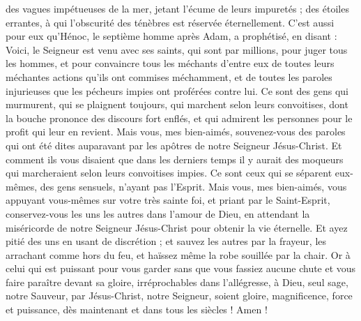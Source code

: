 \begin{multicols}{2}
des vagues impétueuses de la mer, jetant l'écume de leurs impuretés ; des étoiles errantes, à qui l'obscurité des ténèbres est réservée éternellement.
C'est aussi pour eux qu'Hénoc, le septième homme après Adam, a prophétisé, en disant :
Voici, le Seigneur est venu avec ses saints, qui sont par millions, pour juger tous les hommes, et pour convaincre tous les méchants d'entre eux de toutes leurs méchantes actions qu'ils ont commises méchamment, et de toutes les paroles injurieuses que les pécheurs impies ont proférées contre lui.
Ce sont des gens qui murmurent, qui se plaignent toujours, qui marchent selon leurs convoitises, dont la bouche prononce des discours fort enflés, et qui admirent les personnes pour le profit qui leur en revient.
Mais vous, mes bien-aimés, souvenez-vous des paroles qui ont été dites auparavant par les apôtres de notre Seigneur Jésus-Christ.
Et comment ils vous disaient que dans les derniers temps il y aurait des moqueurs qui marcheraient selon leurs convoitises impies.
Ce sont ceux qui se séparent eux-mêmes, des gens sensuels, n'ayant pas l'Esprit.
Mais vous, mes bien-aimés, vous appuyant vous-mêmes sur votre très sainte foi, et priant par le Saint-Esprit,
conservez-vous les uns les autres dans l'amour de Dieu, en attendant la miséricorde de notre Seigneur Jésus-Christ pour obtenir la vie éternelle.
Et ayez pitié des uns en usant de discrétion ;
et sauvez les autres par la frayeur, les arrachant comme hors du feu, et haïssez même la robe souillée par la chair.
Or à celui qui est puissant pour vous garder sans que vous fassiez aucune chute et vous faire paraître devant sa gloire, irréprochables dans l'allégresse,
à Dieu, seul sage, notre Sauveur, par Jésus-Christ, notre Seigneur, soient gloire, magnificence, force et puissance, dès maintenant et dans tous les siècles ! Amen !
\PPE{}
\end{multicols}
